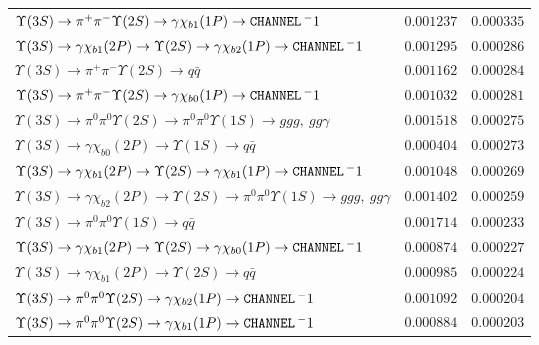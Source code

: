 \documentclass[12pt]{article}
\begin{document}
\begin{tabular}{p{4.7in} l l}
$   \Upsilon(3S) \to \pi^+ \pi^- \Upsilon(2S) \to \gamma \chi_{b1}(1P) \to {\tt \small CHANNEL} \, ^-1                              $ & $   0.001237     $ & $   0.000335     $ \\ 
$   \Upsilon(3S) \to \gamma \chi_{b1}(2P) \to \Upsilon(2S) \to \gamma \chi_{b2}(1P) \to {\tt \small CHANNEL} \, ^-1                 $ & $   0.001295     $ & $   0.000286    $ \\ 
$   \Upsilon(3S) \to \pi^+ \pi^- \Upsilon(2S) \to q\bar{q}                                                               $ & $   0.001162     $ & $   0.000284    $ \\ 
$   \Upsilon(3S) \to \pi^+ \pi^- \Upsilon(2S) \to \gamma \chi_{b0}(1P) \to {\tt \small CHANNEL} \, ^-1                              $ & $   0.001032     $ & $   0.000281    $ \\ 
$   \Upsilon(3S) \to \pi^0 \pi^0 \Upsilon(2S) \to \pi^0 \pi^0 \Upsilon(1S) \to ggg,\ gg\gamma                             $ & $   0.001518      $ & $   0.000275       $ \\ 
$   \Upsilon(3S) \to \gamma \chi_{b0}(2P) \to \Upsilon(1S) \to q\bar{q}                                                  $ & $   0.000404     $ & $   0.000273     $ \\ 
$   \Upsilon(3S) \to \gamma \chi_{b1}(2P) \to \Upsilon(2S) \to \gamma \chi_{b1}(1P) \to {\tt \small CHANNEL} \, ^-1                 $ & $   0.001048               $ & $   0.000269     $ \\ 
$   \Upsilon(3S) \to \gamma \chi_{b2}(2P) \to \Upsilon(2S) \to \pi^0 \pi^0 \Upsilon(1S) \to ggg,\ gg\gamma                $ & $   0.001402     $ & $   0.000259     $ \\ 
$   \Upsilon(3S) \to \pi^0 \pi^0 \Upsilon(1S) \to q\bar{q}                                                               $ & $   0.001714     $ & $   0.000233     $ \\ 
$   \Upsilon(3S) \to \gamma \chi_{b1}(2P) \to \Upsilon(2S) \to \gamma \chi_{b0}(1P) \to {\tt \small CHANNEL} \, ^-1                 $ & $   0.000874     $ & $   0.000227    $ \\ 
$   \Upsilon(3S) \to \gamma \chi_{b1}(2P) \to \Upsilon(2S) \to q\bar{q}                                                  $ & $   0.000985     $ & $   0.000224    $ \\ 
$   \Upsilon(3S) \to \pi^0 \pi^0 \Upsilon(2S) \to \gamma \chi_{b2}(1P) \to {\tt \small CHANNEL} \, ^-1                              $ & $   0.001092                  $ & $   0.000204    $ \\ 
$   \Upsilon(3S) \to \pi^0 \pi^0 \Upsilon(2S) \to \gamma \chi_{b1}(1P) \to {\tt \small CHANNEL} \, ^-1                              $ & $   0.000884     $ & $   0.000203    $ \\ 
\end{tabular}
\end{document}
